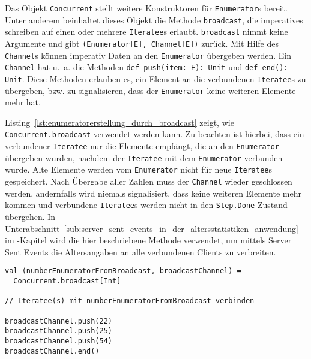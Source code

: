 Das Objekt \lstinline|Concurrent| stellt weitere Konstruktoren für \lstinline|Enumerator|s bereit.
Unter anderem beinhaltet dieses Objekt die Methode \lstinline|broadcast|, die imperatives schreiben auf einen oder mehrere \lstinline|Iteratee|s erlaubt.
\lstinline|broadcast| nimmt keine Argumente und gibt \lstinline|(Enumerator[E], Channel[E])| zurück.
Mit Hilfe des \lstinline|Channel|s können imperativ Daten an den \lstinline|Enumerator| übergeben werden.
Ein \lstinline|Channel| hat u.~a. die Methoden \lstinline|def push(item: E): Unit| und \lstinline|def end(): Unit|.
Diese Methoden erlauben es, ein Element an die verbundenen \lstinline|Iteratee|s zu übergeben, bzw. zu signalisieren, dass der \lstinline|Enumerator| keine weiteren Elemente mehr hat.

Listing~\ref{lst:enumeratorerstellung_durch_broadcast} zeigt, wie \lstinline|Concurrent.broadcast| verwendet werden kann.
Zu beachten ist hierbei, dass ein verbundener \lstinline|Iteratee| nur die Elemente empfängt, die an den \lstinline|Enumerator| übergeben wurden, nachdem der \lstinline|Iteratee| mit dem \lstinline|Enumerator| verbunden wurde.
Alte Elemente werden vom \lstinline|Enumerator| nicht für neue \lstinline|Iteratee|s gespeichert.
Nach Übergabe aller Zahlen muss der \lstinline|Channel| wieder geschlossen werden, andernfalls wird niemals signalisiert, dass keine weiteren Elemente mehr kommen und verbundene \lstinline|Iteratee|s werden nicht in den \lstinline|Step.Done|-Zustand übergehen.
In Unterabschnitt~\ref{sub:server_sent_events_in_der_altersstatistiken_anwendung} im -Kapitel wird die hier beschriebene Methode verwendet, um mittels Server Sent Events die Altersangaben an alle verbundenen Clients zu verbreiten.

\begin{lstlisting}[caption=Erstellung eines Enumerators durch die broadcast-Konstruktormethode, label=lst:enumeratorerstellung_durch_broadcast]
val (numberEnumeratorFromBroadcast, broadcastChannel) =
  Concurrent.broadcast[Int]

// Iteratee(s) mit numberEnumeratorFromBroadcast verbinden

broadcastChannel.push(22)
broadcastChannel.push(25)
broadcastChannel.push(54)
broadcastChannel.end()
\end{lstlisting}



